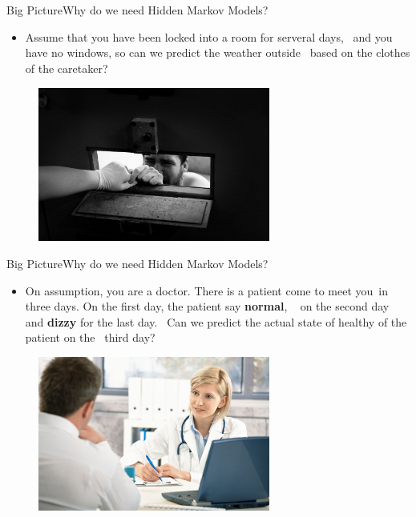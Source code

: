 \documentclass[10pt]{beamer}
\begin{document}
\begin{frame}{Big Picture}{Why do we need Hidden Markov Models?}
 \label{kidnapping_example}
  \begin{itemize}
    \item Assume that you have been locked into a room for serveral days, \
          and you have no windows, so can we predict the weather outside \
          based on the clothes of the caretaker?\cite{Anders}
  \end{itemize}
  \begin{figure}[h]
    \centering
    \includegraphics[width=3in,height=2in]{figures/prisoner.jpg}
  \end{figure}
\end{frame}

\begin{frame}{Big Picture}{Why do we need Hidden Markov Models?}
 \label{kidnapping_example}
  \begin{itemize}
    \item On assumption, you are a doctor. There is a patient come to meet you\
          in three days. On the first day, the patient say \textbf{normal}, \
           on the second day and \textbf{dizzy} for the last day. \
          Can we predict the actual state of healthy of the patient on the \
          third day?
  \end{itemize}
  \begin{figure}[h]
    \centering
    \includegraphics[width=3in,height=2in]{figures/doctor-and-patient.jpg}
  \end{figure}
\end{frame}
\end{document}
